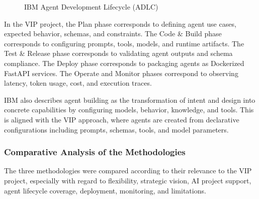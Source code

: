 \begin{figure}[H]
{
    }
    \caption{IBM Agent Development Lifecycle (ADLC)}
    \label{fig:ibm_adlc}
\end{figure}

In the VIP project, the Plan phase corresponds to defining agent use cases, expected behavior, schemas, and constraints. The Code \& Build phase corresponds to configuring prompts, tools, models, and runtime artifacts. The Test \& Release phase corresponds to validating agent outputs and schema compliance. The Deploy phase corresponds to packaging agents as Dockerized FastAPI services. The Operate and Monitor phases correspond to observing latency, token usage, cost, and execution traces.

IBM also describes agent building as the transformation of intent and design into concrete capabilities by configuring models, behavior, knowledge, and tools. This is aligned with the VIP approach, where agents are created from declarative configurations including prompts, schemas, tools, and model parameters.

\subsubsection{Comparative Analysis of the Methodologies}

The three methodologies were compared according to their relevance to the VIP project, especially with regard to flexibility, strategic vision, AI project support, agent lifecycle coverage, deployment, monitoring, and limitations.

